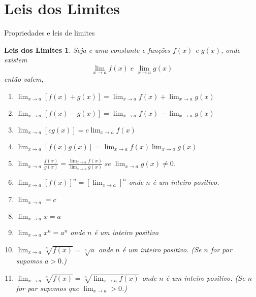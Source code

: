 \section{Leis dos Limites}
Propriedades e leis de limites

\newtheorem*{mydefLLim}{Leis dos Limites}
\begin{mydefLLim}
	Seja c uma constante e funções $f(x)$ e $g(x)$, onde existem 
		$$\lim_{x \to a} f(x) \; e \; \lim_{x \to a} g(x)$$
		então valem,
		\newline
		
		\begin{enumerate}
		\item $ \lim_{x \to a} [f(x) + g(x)] = \lim_{x \to a} f(x) + \lim_{x \to a} g(x)$
		\item $ \lim_{x \to a} [f(x) - g(x)] = \lim_{x \to a} f(x) - \lim_{x \to a} g(x)$
		\item $ \lim_{x \to a} [c  g(x)] = c \lim_{x \to a} f(x)$
		\item $ \lim_{x \to a}[f(x) g(x)] = \lim_{x \to a} f(x) \lim_{x \to a} g(x)$
		\item $ \lim_{x \to a} \frac{f(x)}{g(x)} = \frac{\lim_{x \to a} f(x)}{\lim_{x \to a} g(x)} \; se \; \lim_{x \to a} g(x) \neq 0$.
		\item $ \lim_{x \to a} [f(x)]^{n} = [\lim_{x \to a}]^n$ onde $n$ é um inteiro positivo.
		\item $ \lim_{x \to a} = c$
		\item $ \lim_{x \to a} x = a$
		\item $ \lim_{x \to a} x^n = a^n$ onde $n$ é um inteiro  positivo
		\item $ \lim_{x \to a} \sqrt[n]{f(x)} = \sqrt[n]{a}$ onde $n$ é um inteiro positivo. (Se $n$ for par supomos $a > 0$.)
		\item $ \lim_{x \to a} \sqrt[n]{f(x)} = \sqrt[n]{\lim_{x \to a} f(x)}$ onde $n$ é um inteiro positivo. (Se $n$ for par supomos que  $\lim_{x \to a} > 0$.)
		\end{enumerate}
		
		
		
\end{mydefLLim}



